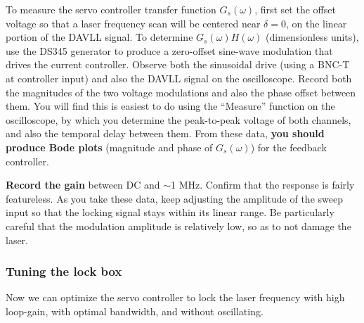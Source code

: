 \documentclass{../lab}
\begin{document}
To measure the servo controller transfer function $G_s(\omega)$, first set the offset voltage so that a laser frequency scan will be centered near $\delta = 0$, on the linear portion of the DAVLL signal. To determine $G_s(\omega)H(\omega)$ (dimensionless units), use the DS345 generator to produce a zero-offset sine-wave modulation that drives the current controller. Observe both the sinusoidal drive (using a BNC-T at controller input) and also the DAVLL signal on the oscilloscope. Record both the magnitudes of the two voltage modulations and also the phase offset between them. You will find this is easiest to do using the ``Measure'' function on the oscilloscope, by which you determine the peak-to-peak voltage of both channels, and also the temporal delay between them. From these data, \textbf{you should produce Bode plots} (magnitude and phase of $G_s(\omega)$) for the feedback controller.

\textbf{Record the gain} between DC and $\sim$1 MHz. Confirm that the response is fairly featureless. As you take these data, keep adjusting the amplitude of the sweep input so that the locking signal stays within its linear range. Be particularly careful that the modulation amplitude is relatively low, so as to not damage the laser.

\subsubsection{Tuning the lock box}

Now we can optimize the servo controller to lock the laser frequency with high loop-gain, with optimal bandwidth, and without oscillating. %
\end{document}
